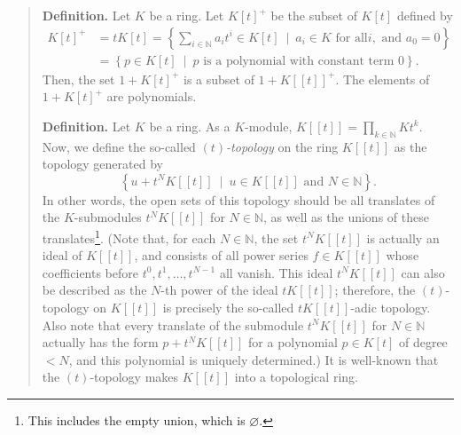 \documentclass[numbers=enddot,12pt,final,onecolumn,notitlepage]{scrartcl}%
\begin{document}
\begin{quote}
\textbf{Definition.} Let $K$ be a ring. Let $K\left[  t\right]  ^{+}$ be the
subset of $K\left[  t\right]  $ defined by%
\begin{align*}
K\left[  t\right]  ^{+}  &  =tK\left[  t\right]  =\left\{  \sum_{i\in
\mathbb{N}}a_{i}t^{i}\in K\left[  t\right]  \ \mid\ a_{i}\in K\text{ for all
}i,\text{ and }a_{0}=0\right\} \\
&  =\left\{  p\in K\left[  t\right]  \ \mid\ p\text{ is a polynomial with
constant term }0\right\}  .
\end{align*}
Then, the set $1+K\left[  t\right]  ^{+}$ is a subset of $1+K\left[  \left[
t\right]  \right]  ^{+}.$ The elements of $1+K\left[  t\right]  ^{+}$ are polynomials.

\textbf{Definition.} Let $K$ be a ring. As a $K$-module, $K\left[  \left[
t\right]  \right]  =\prod\limits_{k\in\mathbb{N}}Kt^{k}$. Now, we define the
so-called $\left(  t\right)  $\textit{-topology} on the ring $K\left[  \left[
t\right]  \right]  $ as the topology generated by%
\[
\left\{  u+t^{N}K\left[  \left[  t\right]  \right]  \ \mid\ u\in K\left[
\left[  t\right]  \right]  \text{ and }N\in\mathbb{N}\right\}  .
\]
In other words, the open sets of this topology should be all translates of the
$K$-submodules $t^{N}K\left[  \left[  t\right]  \right]  $ for $N\in
\mathbb{N}$, as well as the unions of these translates\footnote{This includes
the empty union, which is $\varnothing$.}. (Note that, for each $N\in
\mathbb{N}$, the set $t^{N}K\left[  \left[  t\right]  \right]  $ is actually
an ideal of $K\left[  \left[  t\right]  \right]  $, and consists of all power
series $f\in K\left[  \left[  t\right]  \right]  $ whose coefficients before
$t^{0},t^{1},\ldots,t^{N-1}$ all vanish. This ideal $t^{N}K\left[  \left[
t\right]  \right]  $ can also be described as the $N$-th power of the ideal
$tK\left[  \left[  t\right]  \right]  $; therefore, the $\left(  t\right)
$-topology on $K\left[  \left[  t\right]  \right]  $ is precisely the
so-called $tK\left[  \left[  t\right]  \right]  $-adic topology. Also note
that every translate of the submodule $t^{N}K\left[  \left[  t\right]
\right]  $ for $N\in\mathbb{N}$ actually has the form $p+t^{N}K\left[  \left[
t\right]  \right]  $ for a polynomial $p\in K\left[  t\right]  $ of degree
$<N$, and this polynomial is uniquely determined.) It is well-known that the
$\left(  t\right)  $-topology makes $K\left[  \left[  t\right]  \right]  $
into a topological ring.
\end{quote}
\end{document}
